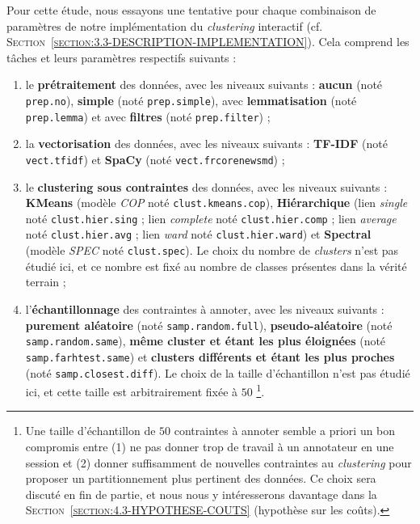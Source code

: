 			Pour cette étude, nous essayons une tentative pour chaque combinaison de paramètres de notre implémentation du \textit{clustering} interactif (cf. \textsc{Section~\ref{section:3.3-DESCRIPTION-IMPLEMENTATION}}). Cela comprend les tâches et leurs paramètres respectifs suivants :
			\begin{enumerate}
				\item le \textbf{prétraitement} des données, avec les niveaux suivants :
				\textbf{aucun} (noté \texttt{prep.no}), \textbf{simple} (noté \texttt{prep.simple}), avec \textbf{lemmatisation} (noté \texttt{prep.lemma}) et avec \textbf{filtres} (noté \texttt{prep.filter}) ;
				\item la \textbf{vectorisation} des données, avec les niveaux suivants :
				\textbf{TF-IDF} (noté \texttt{vect.tfidf}) et \textbf{SpaCy} (noté \texttt{vect.frcorenewsmd}) ;
				\item le \textbf{clustering sous contraintes} des données, avec les niveaux suivants :
				\textbf{KMeans} (modèle \textit{COP} noté \texttt{clust.kmeans.cop}), \textbf{Hiérarchique} (lien \textit{single} noté \texttt{clust.hier.sing} ; lien \textit{complete} noté \texttt{clust.hier.comp} ; lien \textit{average} noté \texttt{clust.hier.avg} ; lien \textit{ward} noté \texttt{clust.hier.ward}) et \textbf{Spectral} (modèle \textit{SPEC} noté \texttt{clust.spec}).
				Le choix du nombre de \textit{clusters} n'est pas étudié ici, et ce nombre est fixé au nombre de classes présentes dans la vérité terrain ;
				\item l'\textbf{échantillonnage} des contraintes à annoter, avec les niveaux suivants :
				\textbf{purement aléatoire} (noté \texttt{samp.random.full}), \textbf{pseudo-aléatoire} (noté \texttt{samp.random.same}), \textbf{même cluster et étant les plus éloignées} (noté \texttt{samp.farhtest.same}) et \textbf{clusters différents et étant les plus proches} (noté \texttt{samp.closest.diff}).
				Le choix de la taille d'échantillon n'est pas étudié ici, et cette taille est arbitrairement fixée à $50$
				\footnote{
					Une taille d'échantillon de $50$ contraintes à annoter semble a priori un bon compromis entre (1) ne pas donner trop de travail à un annotateur en une session et (2) donner suffisamment de nouvelles contraintes au \textit{clustering} pour proposer un partitionnement plus pertinent des données.
					Ce choix sera discuté en fin de partie, et nous nous y intéresserons davantage dans la \textsc{Section~\ref{section:4.3-HYPOTHESE-COUTS}} (hypothèse sur les coûts).
				}.
			\end{enumerate}
			
